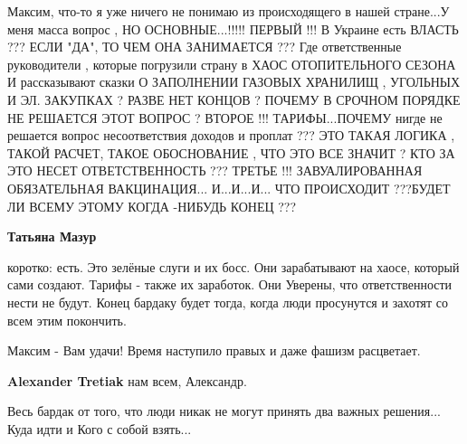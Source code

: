 \begin{itemize}
Максим, что-то я уже ничего не понимаю из происходящего в нашей стране...У меня масса вопрос , НО ОСНОВНЫЕ...!!!!!
ПЕРВЫЙ !!! В Украине есть ВЛАСТЬ ??? ЕСЛИ "ДА", ТО ЧЕМ ОНА ЗАНИМАЕТСЯ ???
Где ответственные руководители , которые погрузили страну в ХАОС ОТОПИТЕЛЬНОГО СЕЗОНА И рассказывают сказки О ЗАПОЛНЕНИИ ГАЗОВЫХ ХРАНИЛИЩ , УГОЛЬНЫХ И ЭЛ. ЗАКУПКАХ ? РАЗВЕ НЕТ КОНЦОВ ?
ПОЧЕМУ В СРОЧНОМ ПОРЯДКЕ НЕ РЕШАЕТСЯ ЭТОТ ВОПРОС ?
ВТОРОЕ !!! ТАРИФЫ...ПОЧЕМУ нигде не решается вопрос несоответствия доходов и проплат ??? ЭТО ТАКАЯ ЛОГИКА , ТАКОЙ РАСЧЕТ, ТАКОЕ ОБОСНОВАНИЕ , ЧТО ЭТО ВСЕ ЗНАЧИТ ?
КТО ЗА ЭТО НЕСЕТ ОТВЕТСТВЕННОСТЬ ???
ТРЕТЬЕ !!! ЗАВУАЛИРОВАННАЯ ОБЯЗАТЕЛЬНАЯ ВАКЦИНАЦИЯ...
И...И...И...
ЧТО ПРОИСХОДИТ ???БУДЕТ ЛИ ВСЕМУ ЭТОМУ КОГДА -НИБУДЬ КОНЕЦ ???

\begin{itemize} %
\textbf{Татьяна Мазур} 

коротко: есть. Это зелёные слуги и их босс. Они зарабатывают на хаосе, который
сами создают. Тарифы - также их заработок. Они Уверены, что ответственности
нести не будут. Конец бардаку будет тогда, когда люди просунутся и захотят со
всем этим покончить.

\end{itemize} %


Максим - Вам удачи! Время наступило правых и даже фашизм расцветает.

\textbf{Alexander Tretiak} нам всем, Александр.


Весь бардак от того, что люди никак не могут принять два важных решения...
Куда идти и Кого с собой взять...

\end{itemize} %
